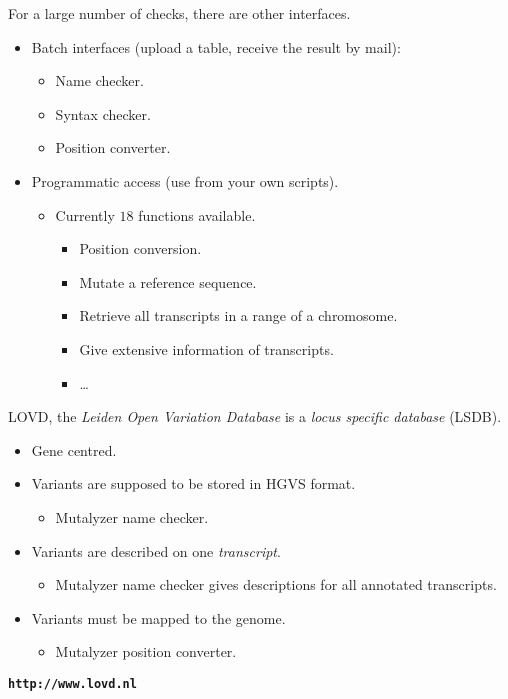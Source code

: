 \documentclass[a4, portrait]{seminar}
\newcommand{\bt}[1]{\texttt{\textbf{#1}}}
\begin{document}
\begin{slide}

  For a large number of checks, there are other interfaces.
  \begin{itemize}
    \item Batch interfaces (upload a table, receive the result by mail):
    \begin{itemize}
      \item Name checker.
      \item Syntax checker.
      \item Position converter.
    \end{itemize}
    \item Programmatic access (use from your own scripts).
    \begin{itemize}
      \item Currently $18$ functions available.
      \begin{itemize}
        \item Position conversion.
        \item Mutate a reference sequence.
        \item Retrieve all transcripts in a range of a chromosome.
        \item Give extensive information of transcripts.
        \item \ldots
      \end{itemize}
    \end{itemize}
  \end{itemize}
  \vfill
\end{slide}

\begin{slide}

  LOVD, the \emph{Leiden Open Variation Database} is a \emph{locus specific
  database} (LSDB).

  \begin{itemize}
    \item Gene centred.
    \item Variants are supposed to be stored in HGVS format.
    \begin{itemize}
      \item Mutalyzer name checker.
    \end{itemize}
    \item Variants are described on one \emph{transcript}.
    \begin{itemize}
      \item Mutalyzer name checker gives descriptions for all annotated
        transcripts.
    \end{itemize}
    \item Variants must be mapped to the genome.
    \begin{itemize}
      \item Mutalyzer position converter.
    \end{itemize}
  \end{itemize}
  
  \begin{center}
    \bt{http://www.lovd.nl}
  \end{center}
  \vfill
\end{slide}
\end{document}
